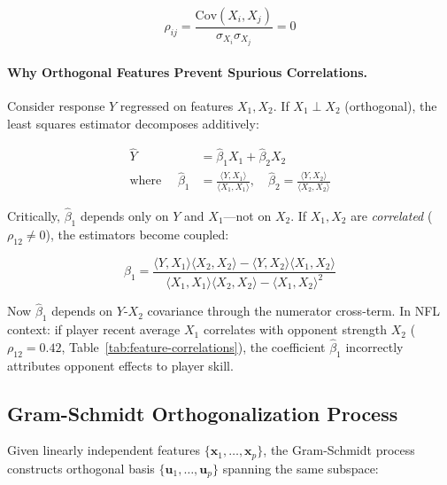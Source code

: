 \begin{equation}
\rho_{ij} = \frac{\text{Cov}(X_i, X_j)}{\sigma_{X_i} \sigma_{X_j}} = 0
\label{eq:correlation-def}
\end{equation}

\paragraph{Why Orthogonal Features Prevent Spurious Correlations.}
Consider response $Y$ regressed on features $X_1, X_2$. If $X_1 \perp X_2$ (orthogonal), the least squares estimator decomposes additively:

\begin{equation}
\begin{aligned}
\hat{Y} &= \hat{\beta}_1 X_1 + \hat{\beta}_2 X_2 \\
\text{where } \quad \hat{\beta}_1 &= \frac{\langle Y, X_1 \rangle}{\langle X_1, X_1 \rangle}, \quad \hat{\beta}_2 = \frac{\langle Y, X_2 \rangle}{\langle X_2, X_2 \rangle}
\end{aligned}
\label{eq:orthogonal-regression}
\end{equation}

Critically, $\hat{\beta}_1$ depends only on $Y$ and $X_1$---not on $X_2$. If $X_1, X_2$ are \emph{correlated} ($\rho_{12} \neq 0$), the estimators become coupled:

\begin{equation}
\hat{\beta}_1 = \frac{\langle Y, X_1 \rangle \langle X_2, X_2 \rangle - \langle Y, X_2 \rangle \langle X_1, X_2 \rangle}{\langle X_1, X_1 \rangle \langle X_2, X_2 \rangle - \langle X_1, X_2 \rangle^2}
\end{equation}

Now $\hat{\beta}_1$ depends on $Y$-$X_2$ covariance through the numerator cross-term. In NFL context: if player recent average $X_1$ correlates with opponent strength $X_2$ ($\rho_{12} = 0.42$, Table~\ref{tab:feature-correlations}), the coefficient $\hat{\beta}_1$ incorrectly attributes opponent effects to player skill.

\subsection{Gram-Schmidt Orthogonalization Process}

Given linearly independent features $\{\mathbf{x}_1, \ldots, \mathbf{x}_p\}$, the Gram-Schmidt process constructs orthogonal basis $\{\mathbf{u}_1, \ldots, \mathbf{u}_p\}$ spanning the same subspace:

